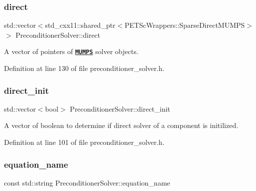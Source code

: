 \subsubsection{\texorpdfstring{direct}{direct}}
{\footnotesize\ttfamily std\+::vector$<$std\+\_\+cxx11\+::shared\+\_\+ptr$<$P\+E\+T\+Sc\+Wrappers\+::\+Sparse\+Direct\+M\+U\+M\+PS$>$ $>$ Preconditioner\+Solver\+::direct\hspace{0.3cm}{\ttfamily [private]}}



A vector of pointers of \href{https://www.dealii.org/8.5.0/doxygen/deal.II/classPETScWrappers_1_1SparseDirectMUMPS.html}{\tt {\bfseries M\+U\+M\+PS}} solver objects. 



Definition at line 130 of file preconditioner\+\_\+solver.\+h.

\mbox{\label{class_preconditioner_solver_a0241f0b26a8c964fc1e3fd8fef5a20a6}} 
\subsubsection{\texorpdfstring{direct\+\_\+init}{direct\_init}}
{\footnotesize\ttfamily std\+::vector$<$bool$>$ Preconditioner\+Solver\+::direct\+\_\+init\hspace{0.3cm}{\ttfamily [private]}}



A vector of boolean to determine if direct solver of a component is initilized. 



Definition at line 101 of file preconditioner\+\_\+solver.\+h.

\mbox{\label{class_preconditioner_solver_af20758bf54111e7092c49688622b1e54}} 
\subsubsection{\texorpdfstring{equation\+\_\+name}{equation\_name}}
{\footnotesize\ttfamily const std\+::string Preconditioner\+Solver\+::equation\+\_\+name\hspace{0.3cm}{\ttfamily [private]}}



